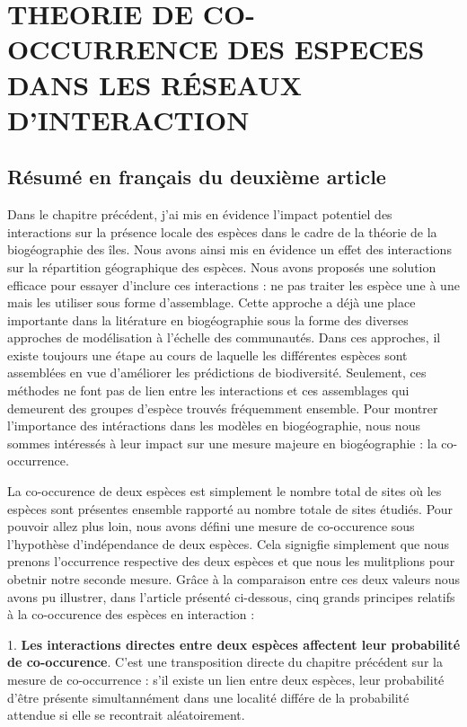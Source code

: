 \chapter{THEORIE DE CO-OCCURRENCE DES ESPECES DANS LES RÉSEAUX D'INTERACTION}


\section{Résumé en français du deuxième article}

Dans le chapitre précédent, j'ai mis en évidence l'impact potentiel des interactions sur la présence locale des espèces dans le cadre de la théorie de la biogéographie des îles. Nous avons ainsi mis en évidence un effet des interactions sur la répartition géographique des espèces. Nous avons proposés une solution efficace pour essayer d'inclure ces interactions : ne pas traiter les espèce une à une mais les utiliser sous forme d'assemblage. Cette approche a déjà une place importante dans la litérature en biogéographie sous la forme des diverses approches de modélisation à l'échelle des communautés. Dans ces approches, il existe toujours une étape au cours de laquelle les différentes espèces sont assemblées en vue d'améliorer les prédictions de biodiversité. Seulement, ces méthodes ne font pas de lien entre les interactions et ces assemblages qui demeurent des groupes d'espèce trouvés fréquemment ensemble. Pour montrer l'importance des intéractions dans les modèles en biogéographie, nous nous sommes intéressés à leur impact sur une mesure majeure en biogéographie : la co-occurrence.

La co-occurence de deux espèces est simplement le nombre total de sites où les espèces sont présentes ensemble rapporté au nombre totale de sites étudiés. Pour pouvoir allez plus loin, nous avons défini une mesure de co-occurence sous l'hypothèse d'indépendance de deux espèces. Cela signigfie simplement que nous prenons l'occurrence respective des deux espèces et que nous les mulitplions pour obetnir notre seconde mesure. Grâce à la comparaison entre ces deux valeurs nous avons pu illustrer, dans l'article présenté ci-dessous, cinq grands principes relatifs à la co-occurence des espèces en interaction :

1. \textbf{Les interactions directes entre deux espèces affectent leur probabilité de co-occurence}. C'est une transposition directe du chapitre précédent sur la mesure de co-occurrence : s'il existe un lien entre deux espèces, leur probabilité d'être présente simultannément dans une localité différe de la probabilité attendue si elle se recontrait aléatoirement.

